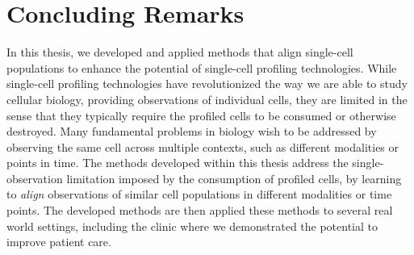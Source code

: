 
\chapter{Concluding Remarks}

In this thesis, we developed and applied methods that align single-cell populations to enhance the potential of single-cell profiling technologies.
While single-cell profiling technologies have revolutionized the way we are able to study cellular biology, providing observations of individual cells,
they are limited in the sense that they typically require the profiled cells to be consumed or otherwise destroyed.
Many fundamental problems in biology wish to be addressed by observing the same cell across multiple contexts, such as different modalities or points in time.
The methods developed within this thesis address the single-observation limitation imposed by the consumption of profiled cells,
by learning to \emph{align} observations of similar cell populations in different modalities or time points.
The developed methods are then applied these methods to several real world settings,
including the clinic where we demonstrated the potential to improve patient care.

